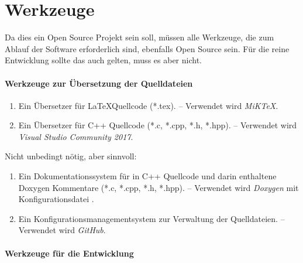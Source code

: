 \section{Werkzeuge}%
\label{sec:Werkzeuge}

Da dies ein Open Source Projekt sein soll,
müssen alle Werkzeuge,
die zum Ablauf der Software erforderlich sind,
ebenfalls Open Source sein.
Für die reine Entwicklung sollte das auch gelten, muss es aber nicht.

\paragraph{Werkzeuge zur Übersetzung der Quelldateien}%

\begin{enumerate}

	\item\label{Werkzeug:LaTeX}
	Ein Übersetzer für \LaTeX Quellcode (*.tex).
	-- Verwendet wird \emph{MiK\TeX}.

	\item\label{Werkzeug:C++}
	Ein Übersetzer für C++ Quellcode (*.c, *.cpp, *.h, *.hpp).
	-- Verwendet wird \emph{Visual Studio Community 2017}.

	\setcounter{Enumi}{\value{enumi}}%
\end{enumerate}
Nicht unbedingt nötig, aber sinnvoll:
\begin{enumerate}
	\setcounter{enumi}{\value{Enumi}}%

	\item\label{Werkzeug:Dokumentation}
	Ein Dokumentationssystem für in C++ Quellcode und darin enthaltene Doxygen Kommentare (*.c, *.cpp, *.h, *.hpp).
	-- Verwendet wird \emph{Doxygen} mit Konfigurationsdatei .

	\item\label{Werkzeug:Konfigurationsmanagement}
	Ein Konfigurationsmanagementsystem zur Verwaltung der Quelldateien.
	-- Verwendet wird \emph{GitHub}.

	\setcounter{Enumi}{\value{enumi}}%
\end{enumerate}

\paragraph{Werkzeuge für die Entwicklung}%

